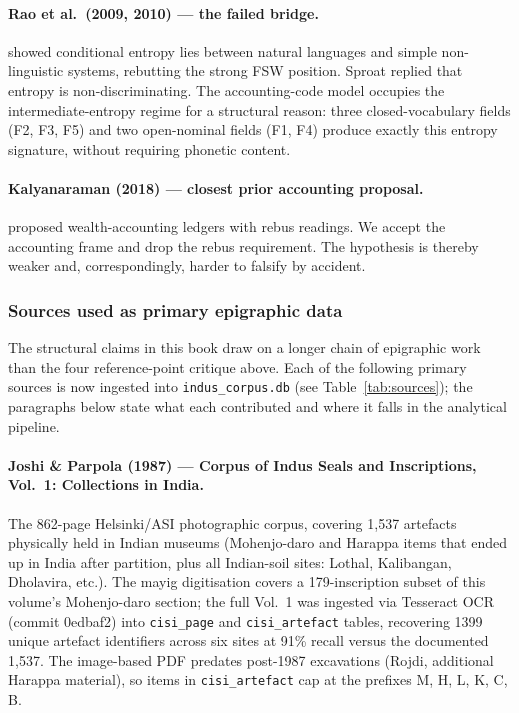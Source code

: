\paragraph{Rao et al.\ (2009, 2010) --- the failed bridge.}\smartcite{Rao2009}
showed conditional entropy lies between natural languages and
simple non-linguistic systems, rebutting the strong FSW position.
Sproat replied that entropy is non-discriminating.
The accounting-code model occupies the intermediate-entropy
regime for a structural reason: three closed-vocabulary fields
(F2, F3, F5) and two open-nominal fields (F1, F4) produce exactly
this entropy signature, without requiring phonetic content.

\paragraph{Kalyanaraman (2018) --- closest prior accounting proposal.}\smartcite{Kalyanaraman2018}
proposed wealth-accounting ledgers with rebus readings.
We accept the accounting frame and drop the rebus requirement.
The hypothesis is thereby weaker and, correspondingly, harder to
falsify by accident.

\subsubsection*{Sources used as primary epigraphic data}

The structural claims in this book draw on a longer chain of
epigraphic work than the four reference-point critique above.
Each of the following primary sources is now ingested into
\texttt{indus\_corpus.db} (see Table~\ref{tab:sources}); the
paragraphs below state what each contributed and where it falls in
the analytical pipeline.

\paragraph{Joshi \& Parpola (1987) --- Corpus of Indus Seals and
Inscriptions, Vol.~1: Collections in India.}\smartcite{JoshiParpola1987}
The 862-page Helsinki/ASI photographic corpus, covering 1{,}537
artefacts physically held in Indian museums (Mohenjo-daro and Harappa
items that ended up in India after partition, plus all Indian-soil
sites: Lothal, Kalibangan, Dholavira, etc.). The mayig digitisation
covers a 179-inscription subset of this volume's Mohenjo-daro section;
the full Vol.~1 was ingested via Tesseract OCR (commit 0edbaf2) into
\texttt{cisi\_page} and \texttt{cisi\_artefact} tables, recovering
\num{1399} unique artefact identifiers across six sites at 91\%
recall versus the documented 1{,}537. The image-based PDF predates
post-1987 excavations (Rojdi, additional Harappa material), so
items in \texttt{cisi\_artefact} cap at the prefixes M, H, L, K, C, B.


